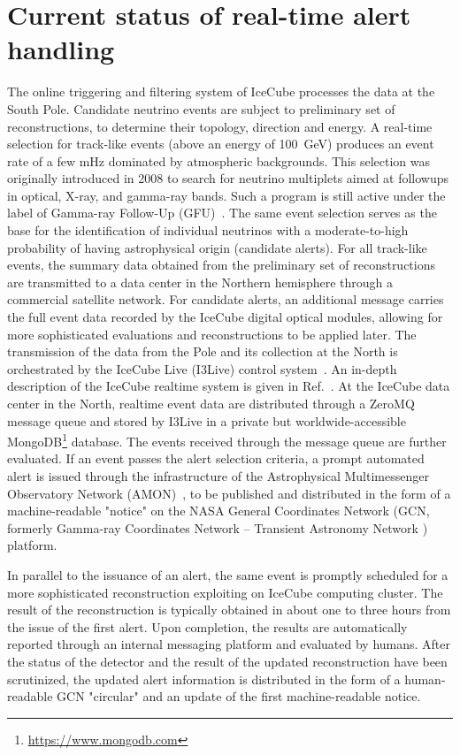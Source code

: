 \documentclass[a4paper,11pt]{article}
\begin{document}
\section{Current status of real-time alert handling}

The online triggering and filtering system of IceCube processes the data at the South Pole. Candidate neutrino events are subject to preliminary set of reconstructions, to determine their topology, direction and energy. A real-time selection for track-like events (above an energy of \SI{100}{GeV}) produces an event rate of a few mHz dominated by atmospheric backgrounds. This selection was originally introduced in 2008 to search for neutrino multiplets aimed at followups in optical, X-ray, and gamma-ray bands. Such a program is still active under the label of Gamma-ray Follow-Up (GFU)~\cite{IceCube:2023icrc-GFU}.
The same event selection serves as the base for the identification of individual neutrinos with a moderate-to-high probability of having astrophysical origin (candidate alerts). For all track-like events, the summary data obtained from the preliminary set of reconstructions are transmitted to a data center in the Northern hemisphere through a commercial satellite network. For candidate alerts, an additional message carries the full event data recorded by the IceCube digital optical modules, allowing for more sophisticated evaluations and reconstructions to be applied later. The transmission of the data from the Pole and its collection at the North is orchestrated by the IceCube Live (I3Live) control system~\cite{IceCube:2016zyt-INST}. An in-depth description of the IceCube realtime system is given in Ref.~\cite{IceCube:2016cqr-RT}. At the IceCube data center in the North, realtime event data are distributed through a ZeroMQ \cite{ZeroMQ} message queue and stored by I3Live in a private but worldwide-accessible MongoDB\footnote{\url{https://www.mongodb.com}} database. The events received through the message queue are further evaluated. If an event passes the alert selection criteria, a prompt automated alert is issued through the infrastructure of the Astrophysical Multimessenger Observatory Network (AMON)~\cite{AyalaSolares:2019iiy}, to be published and distributed in the form of a machine-readable "notice" on the NASA General Coordinates Network (GCN, formerly Gamma-ray Coordinates Network -- Transient Astronomy Network \cite{NASA-GCN}) platform.

In parallel to the issuance of an alert, the same event is promptly scheduled for a more sophisticated reconstruction exploiting on IceCube computing cluster. The result of the reconstruction is typically obtained in about one to three hours from the issue of the first alert. Upon completion, the results are automatically reported through an internal messaging platform and evaluated by humans. After the status of the detector and the result of the updated reconstruction have been scrutinized, the updated alert information is distributed in the form of a human-readable GCN "circular" and an update of the first machine-readable notice.
\end{document}
